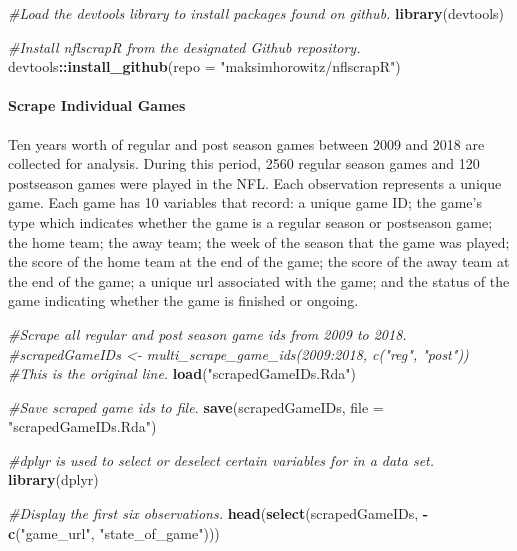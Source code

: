 \documentclass[
]{article}
\newenvironment{Shaded}{\begin{snugshade}}{\end{snugshade}}
\newcommand{\CommentTok}[1]{\textcolor[rgb]{0.56,0.35,0.01}{\textit{#1}}}
\newcommand{\DataTypeTok}[1]{\textcolor[rgb]{0.13,0.29,0.53}{#1}}
\newcommand{\KeywordTok}[1]{\textcolor[rgb]{0.13,0.29,0.53}{\textbf{#1}}}
\newcommand{\NormalTok}[1]{#1}
\newcommand{\OperatorTok}[1]{\textcolor[rgb]{0.81,0.36,0.00}{\textbf{#1}}}
\newcommand{\StringTok}[1]{\textcolor[rgb]{0.31,0.60,0.02}{#1}}
\let\oldparagraph\paragraph
\renewcommand{\paragraph}[1]{\oldparagraph{#1}\mbox{}}
\begin{document}
\begin{Shaded}
\begin{Highlighting}[]
\CommentTok{#Load the devtools library to install packages found on github.}
\KeywordTok{library}\NormalTok{(devtools)}

\CommentTok{#Install nflscrapR from the designated Github repository.}
\NormalTok{devtools}\OperatorTok{::}\KeywordTok{install_github}\NormalTok{(}\DataTypeTok{repo =} \StringTok{"maksimhorowitz/nflscrapR"}\NormalTok{)}
\end{Highlighting}
\end{Shaded}

\hypertarget{scrape-individual-games}{%
\paragraph{Scrape Individual Games}\label{scrape-individual-games}}

Ten years worth of regular and post season games between 2009 and 2018
are collected for analysis. During this period, 2560 regular season
games and 120 postseason games were played in the NFL. Each observation
represents a unique game. Each game has 10 variables that record: a
unique game ID; the game's type which indicates whether the game is a
regular season or postseason game; the home team; the away team; the
week of the season that the game was played; the score of the home team
at the end of the game; the score of the away team at the end of the
game; a unique url associated with the game; and the status of the game
indicating whether the game is finished or ongoing.

\begin{Shaded}
\begin{Highlighting}[]
\CommentTok{#Scrape all regular and post season game ids from 2009 to 2018.}
\CommentTok{#scrapedGameIDs <- multi_scrape_game_ids(2009:2018, c("reg", "post")) #This is the original line.}
\KeywordTok{load}\NormalTok{(}\StringTok{"scrapedGameIDs.Rda"}\NormalTok{)}

\CommentTok{#Save scraped game ids to file.}
\KeywordTok{save}\NormalTok{(scrapedGameIDs, }\DataTypeTok{file =} \StringTok{"scrapedGameIDs.Rda"}\NormalTok{)}

\CommentTok{#dplyr is used to select or deselect certain variables for in a data set. }
\KeywordTok{library}\NormalTok{(dplyr)}

\CommentTok{#Display the first six observations.}
\KeywordTok{head}\NormalTok{(}\KeywordTok{select}\NormalTok{(scrapedGameIDs, }\OperatorTok{-}\KeywordTok{c}\NormalTok{(}\StringTok{"game_url"}\NormalTok{, }\StringTok{"state_of_game"}\NormalTok{)))}
\end{Highlighting}
\end{Shaded}
\end{document}
